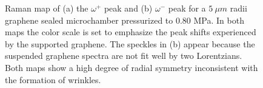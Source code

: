 \begin{figure}
\begin{center}
\end{center}
\caption{\label{cylindrical} Raman map of (a) the $\omega^+$ peak and (b) $\omega^-$ peak for a $5 \ \mu m$ radii graphene sealed microchamber pressurized to 0.80 MPa.  In both maps the color scale is set to emphasize the peak shifts experienced by the supported graphene.  The speckles in (b) appear because the suspended graphene spectra are not fit well by two Lorentzians.  Both maps show a high degree of radial symmetry inconsistent with the formation of wrinkles.}
\end{figure}

